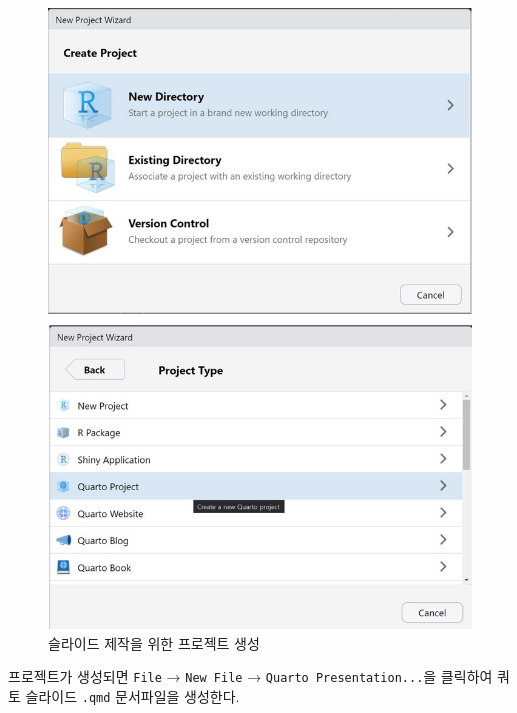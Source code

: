 \documentclass[
  letterpaper,
]{book}
\begin{document}
\begin{figure}
\begin{minipage}[t]{0.50\linewidth}
{{\includegraphics{images/dw_slide_one_image.jpg}

}

}

\end{minipage}%

\caption{\label{fig-slide}슬라이드 제작을 위한 프로젝트 생성}

\end{figure}

프로젝트가 생성되면 \texttt{File} → \texttt{New\ File} →
\texttt{Quarto\ Presentation...}을 클릭하여 쿼토 슬라이드 \texttt{.qmd}
문서파일을 생성한다.
\end{document}
